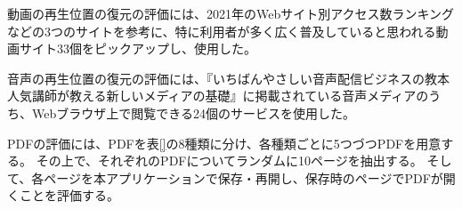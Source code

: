 

動画の再生位置の復元の評価には、2021年のWebサイト別アクセス数ランキング\cite{The-50-Most-Visited-Websites-in-the-World}などの3つのサイト\cite{mmd-video-research}\cite{popular-video-service}を参考に、特に利用者が多く広く普及していると思われる動画サイト33個をピックアップし、使用した。

音声の再生位置の復元の評価には、『いちばんやさしい音声配信ビジネスの教本 人気講師が教える新しいメディアの基礎』\cite{}に掲載されている音声メディアのうち、Webブラウザ上で閲覧できる24個のサービスを使用した。

PDFの評価には、PDFを表\ref{}の8種類に分け、各種類ごとに5つづつPDFを用意する。
その上で、それぞれのPDFについてランダムに10ページを抽出する。
そして、各ページを本アプリケーションで保存・再開し、保存時のページでPDFが開くことを評価する。